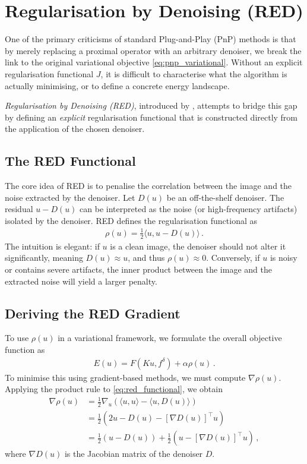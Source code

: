 \section{Regularisation by Denoising (RED)}
\label{sec:red}

One of the primary criticisms of standard Plug-and-Play (PnP) methods is that by merely replacing a proximal operator with an arbitrary denoiser, we break the link to the original variational objective \eqref{eq:pnp_variational}. Without an explicit regularisation functional $J$, it is difficult to characterise what the algorithm is actually minimising, or to define a concrete energy landscape.

\emph{Regularisation by Denoising (RED)}, introduced by \cite{romano2017little}, attempts to bridge this gap by defining an \emph{explicit} regularisation functional that is constructed directly from the application of the chosen denoiser.

\subsection{The RED Functional}
The core idea of RED is to penalise the correlation between the image and the noise extracted by the denoiser. Let $D(u)$ be an off-the-shelf denoiser. The residual $u - D(u)$ can be interpreted as the noise (or high-frequency artifacts) isolated by the denoiser. RED defines the regularisation functional as
\begin{align}
    \rho(u) = \frac{1}{2} \langle u, u - D(u) \rangle \, .
    \label{eq:red_functional}
\end{align}
The intuition is elegant: if $u$ is a clean image, the denoiser should not alter it significantly, meaning $D(u) \approx u$, and thus $\rho(u) \approx 0$. Conversely, if $u$ is noisy or contains severe artifacts, the inner product between the image and the extracted noise will yield a larger penalty.

\subsection{Deriving the RED Gradient}
To use $\rho(u)$ in a variational framework, we formulate the overall objective function as
\begin{align}
    E(u) = F(Ku, f^\delta) + \alpha \rho(u) \, .
    \label{eq:red_objective}
\end{align}
To minimise this using gradient-based methods, we must compute $\nabla \rho(u)$. Applying the product rule to \eqref{eq:red_functional}, we obtain
\begin{align}
    \nabla \rho(u) &= \frac{1}{2} \nabla_u \left( \langle u, u \rangle - \langle u, D(u) \rangle \right) \nonumber \\
    &= \frac{1}{2} \left( 2u - D(u) - [\nabla D(u)]^\top u \right) \nonumber \\
    &= \frac{1}{2} \left( u - D(u) \right) + \frac{1}{2} \left( u - [\nabla D(u)]^\top u \right) \, ,
    \label{eq:red_gradient_expansion}
\end{align}
where $\nabla D(u)$ is the Jacobian matrix of the denoiser $D$. 

